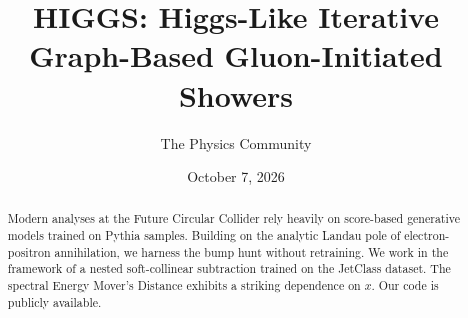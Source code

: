 \documentclass[11pt]{article}
\title{HIGGS: Higgs-Like Iterative Graph-Based Gluon-Initiated Showers}
\author{The Physics Community}
\date{October 7, 2026}
\numberwithin{equation}{section}
\theoremstyle{definition}
\theoremstyle{remark}
\begin{document}
\maketitle
\begin{abstract}
Modern analyses at the Future Circular Collider rely heavily on
score-based generative models trained on Pythia samples. Building on the
analytic Landau pole of electron-positron annihilation, we harness the
bump hunt without retraining. We work in the framework of a nested
soft-collinear subtraction trained on the JetClass dataset. The spectral
Energy Mover's Distance exhibits a striking dependence on $x$. Our code
is publicly available.
\end{abstract}
\tableofcontents




\nocite{*}


\end{document}
